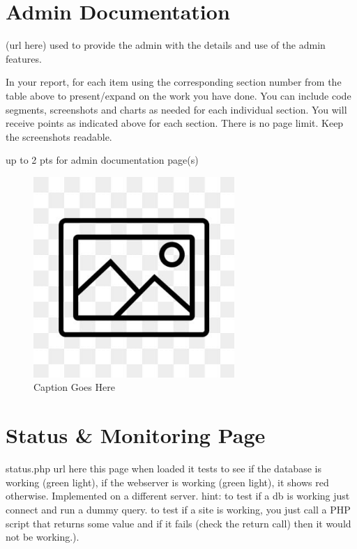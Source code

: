 \documentclass[12pt, letterpaper]{article}
\begin{document}
 \newpage

\section{Admin Documentation}
(url here) used to provide the admin with the details and use of the admin features.

In your report, for each item using the corresponding section number from the table above to present/expand on the work you have done. You can include code segments, screenshots and charts as needed for each individual section. You will receive points as indicated above for each section. There is no page limit. Keep the screenshots readable.

up to 2 pts for admin documentation page(s)

\begin{figure}[htbp]
	\centering
	\includegraphics[width=3in]{images/placeholder.jpg}
	\caption{Caption Goes Here}
 \end{figure}

 \newpage

\section{Status \& Monitoring Page}
status.php url here this page when loaded it tests to see if the database is working (green light), if the webserver is working (green light), it shows red otherwise. Implemented on a different server. hint: to test if a db is working just connect and run a dummy query. to test if a site is working, you just call a PHP script that returns some value and if it fails (check the return call) then it would not be working.).
\end{document}
